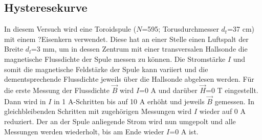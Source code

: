     \subsection{Hysteresekurve}

        In diesem Versuch wird eine Toroidspule ($N$=595; Torusdurchmesser $d_t$=37 \si{\centi\meter}) mit einem ?Eisenkern
        verwendet. Diese hat an einer Stelle einen Luftspalt der Breite $d_l$=3 \si{\milli\meter}, um in 
        dessen Zentrum mit einer transversalen Hallsonde die magnetische Flussdichte der Spule messen zu können.
        Die Stromstärke $I$ und somit die  magnetische Feldstärke der Spule kann
        variiert und die dementsprechende Flussdichte jeweils über die Hallsonde abgelesen werden.
        Für die erste Messung der Flussdichte $\vec B$ wird $I$=0 \si{\ampere} und darüber $\vec H$=0 \si{\tesla}
        eingestellt. Dann wird in  $I$ in 1 \si{\ampere}-Schritten bis auf 10 \si{\ampere} erhöht und jeweils $\vec B$
        gemessen. In gleichbleibenden Schritten mit zugehörigen Messungen wird $I$ wieder auf 0 \si{\ampere}
        reduziert. Der an der Spule anliegende Strom wird nun umgepolt und alle Messungen werden
        wiederholt, bis am Ende wieder $I$=0 \si{\ampere} ist.

        
        

        

        


